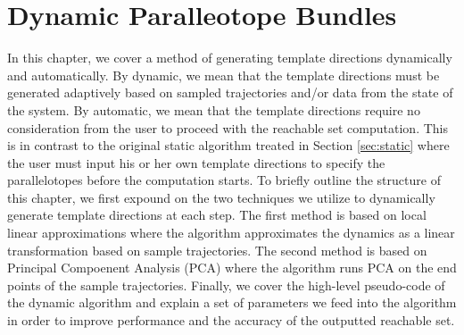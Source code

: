 \chapter{Dynamic Paralleotope Bundles}

In this chapter, we cover a method of generating template directions dynamically and automatically. By dynamic, we mean that the template directions must be generated adaptively based on sampled trajectories and/or data from the state of the system.
%
 By automatic, we mean that the template directions require no consideration from the user to proceed with the reachable set computation. This is in contrast to the original static algorithm treated in Section \ref{sec:static} where the user must input his or her own template directions to specify the parallelotopes before the computation starts.
%
To briefly outline the structure of this chapter, we first expound on the two techniques we utilize to dynamically generate template directions at each step.
%
The first method is based on local linear approximations where the algorithm approximates the dynamics as a linear transformation based on sample trajectories.
%
The second method is based on Principal Compoenent Analysis (PCA) where the algorithm runs PCA on the end points of the sample trajectories.
%
Finally, we cover the high-level pseudo-code of the dynamic algorithm and explain a set of parameters we feed into the algorithm in order to improve performance and the accuracy of the outputted reachable set.



